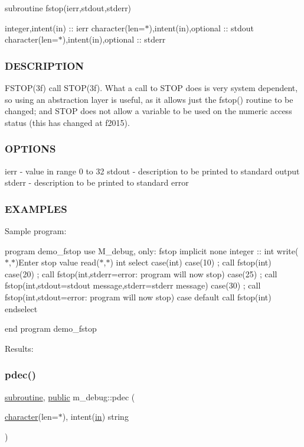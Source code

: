 subroutine fstop(ierr,stdout,stderr)

integer,intent(in) \+:\+: ierr character(len=$\ast$),intent(in),optional \+:\+: stdout character(len=$\ast$),intent(in),optional \+:\+: stderr \subsubsection*{D\+E\+S\+C\+R\+I\+P\+T\+I\+ON}

\begin{DoxyVerb}FSTOP(3f) call STOP(3f).  What a call to STOP does is very system
dependent, so using an abstraction layer is useful, as it allows just
the fstop() routine to be changed; and STOP does not allow a variable
to be used on the numeric access status (this has changed at f2015).
\end{DoxyVerb}


\subsubsection*{O\+P\+T\+I\+O\+NS}

ierr -\/ value in range 0 to 32 stdout -\/ description to be printed to standard output stderr -\/ description to be printed to standard error \subsubsection*{E\+X\+A\+M\+P\+L\+ES}

Sample program\+:

program demo\+\_\+fstop use M\+\_\+debug, only\+: fstop implicit none integer \+:\+: int write($\ast$,$\ast$)\textquotesingle{}Enter stop value\textquotesingle{} read($\ast$,$\ast$) int select case(int) case(10) ; call fstop(int) case(20) ; call fstop(int,stderr=\textquotesingle{}error\+: program will now stop\textquotesingle{}) case(25) ; call fstop(int,stdout=\textquotesingle{}stdout message\textquotesingle{},stderr=\textquotesingle{}stderr message\textquotesingle{}) case(30) ; call fstop(int,stdout=\textquotesingle{}error\+: program will now stop\textquotesingle{}) case default call fstop(int) endselect

end program demo\+\_\+fstop

Results\+: \mbox{\label{namespacem__debug_a9b456606b4c555ed2e1e453aa9c872cb}} 
\subsubsection{\texorpdfstring{pdec()}{pdec()}}
{\footnotesize\ttfamily \hyperlink{M__stopwatch_83_8txt_acfbcff50169d691ff02d4a123ed70482}{subroutine}, \hyperlink{M__stopwatch_83_8txt_a2f74811300c361e53b430611a7d1769f}{public} m\+\_\+debug\+::pdec (\begin{DoxyParamCaption}\item[{\hyperlink{option__stopwatch_83_8txt_abd4b21fbbd175834027b5224bfe97e66}{character}(len=$\ast$), intent(\hyperlink{M__journal_83_8txt_afce72651d1eed785a2132bee863b2f38}{in})}]{string }\end{DoxyParamCaption})}



